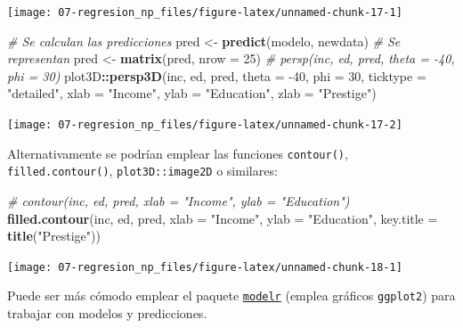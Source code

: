 \documentclass[
  spanish,
]{book}
\newenvironment{Shaded}{\begin{snugshade}}{\end{snugshade}}
\newcommand{\CommentTok}[1]{\textcolor[rgb]{0.56,0.35,0.01}{\textit{#1}}}
\newcommand{\DataTypeTok}[1]{\textcolor[rgb]{0.13,0.29,0.53}{#1}}
\newcommand{\DecValTok}[1]{\textcolor[rgb]{0.00,0.00,0.81}{#1}}
\newcommand{\KeywordTok}[1]{\textcolor[rgb]{0.13,0.29,0.53}{\textbf{#1}}}
\newcommand{\NormalTok}[1]{#1}
\newcommand{\OperatorTok}[1]{\textcolor[rgb]{0.81,0.36,0.00}{\textbf{#1}}}
\newcommand{\StringTok}[1]{\textcolor[rgb]{0.31,0.60,0.02}{#1}}
\theoremstyle{break}
\theoremstyle{definition}
\theoremstyle{definition}
\theoremstyle{definition}
\theoremstyle{remark}
\begin{document}
\begin{center}\texttt{[image: 07-regresion\_np\_files/figure-latex/unnamed-chunk-17-1]} \end{center}

\begin{Shaded}
\begin{Highlighting}[]
\CommentTok{# Se calculan las predicciones}
\NormalTok{pred <-}\StringTok{ }\KeywordTok{predict}\NormalTok{(modelo, newdata)}
\CommentTok{# Se representan}
\NormalTok{pred <-}\StringTok{ }\KeywordTok{matrix}\NormalTok{(pred, }\DataTypeTok{nrow =} \DecValTok{25}\NormalTok{)}
\CommentTok{# persp(inc, ed, pred, theta = -40, phi = 30)}
\NormalTok{plot3D}\OperatorTok{::}\KeywordTok{persp3D}\NormalTok{(inc, ed, pred, }\DataTypeTok{theta =} \DecValTok{-40}\NormalTok{, }\DataTypeTok{phi =} \DecValTok{30}\NormalTok{, }\DataTypeTok{ticktype =} \StringTok{"detailed"}\NormalTok{,}
                \DataTypeTok{xlab =} \StringTok{"Income"}\NormalTok{, }\DataTypeTok{ylab =} \StringTok{"Education"}\NormalTok{, }\DataTypeTok{zlab =} \StringTok{"Prestige"}\NormalTok{)}
\end{Highlighting}
\end{Shaded}

\begin{center}\texttt{[image: 07-regresion\_np\_files/figure-latex/unnamed-chunk-17-2]} \end{center}

Alternativamente se podrían emplear las funciones \texttt{contour()}, \texttt{filled.contour()}, \texttt{plot3D::image2D} o similares:

\begin{Shaded}
\begin{Highlighting}[]
\CommentTok{# contour(inc, ed, pred, xlab = "Income", ylab = "Education")}
\KeywordTok{filled.contour}\NormalTok{(inc, ed, pred, }\DataTypeTok{xlab =} \StringTok{"Income"}\NormalTok{, }\DataTypeTok{ylab =} \StringTok{"Education"}\NormalTok{, }\DataTypeTok{key.title =} \KeywordTok{title}\NormalTok{(}\StringTok{"Prestige"}\NormalTok{))}
\end{Highlighting}
\end{Shaded}

\begin{center}\texttt{[image: 07-regresion\_np\_files/figure-latex/unnamed-chunk-18-1]} \end{center}

Puede ser más cómodo emplear el paquete \href{https://modelr.tidyverse.org}{\texttt{modelr}} (emplea gráficos \texttt{ggplot2}) para trabajar con modelos y predicciones.
\end{document}
